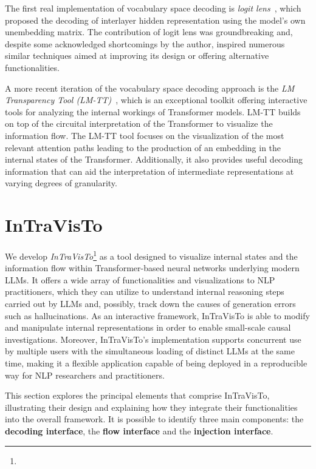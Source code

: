 \documentclass[11pt,a4paper,twocolumn]{article}
\begin{document}
The first real implementation of vocabulary space decoding is \emph{logit lens}~\cite{nostalgebraist2020}, which proposed the decoding of interlayer hidden representation using the model's own unembedding matrix.
The contribution of logit lens was groundbreaking and, despite some acknowledged shortcomings by the author, inspired numerous similar techniques aimed at improving its design or offering alternative functionalities.

A more recent iteration of the vocabulary space decoding approach is the \emph{LM Transparency Tool (LM-TT)}~\cite{tufanov2024}, which is an exceptional toolkit offering interactive tools for analyzing the internal workings of Transformer models.
LM-TT builds on top of the circuital interpretation of the Transformer to visualize the information flow.
The LM-TT tool focuses on the visualization of the most relevant attention paths leading to the production of an embedding in the internal states of the Transformer.
Additionally, it also provides useful decoding information that can aid the interpretation of intermediate representations at varying degrees of granularity.

\section{InTraVisTo}\label{sec:intravisto}

We develop \emph{InTraVisTo}\footnote{} as a tool designed to visualize internal states and the information flow within Transformer-based neural networks underlying modern LLMs.
It offers a wide array of functionalities and visualizations to NLP practitioners, which they can utilize to understand internal reasoning steps carried out by LLMs and, possibly, track down the causes of generation errors such as hallucinations.
As an interactive framework, InTraVisTo is able to modify and manipulate internal representations in order to enable small-scale causal investigations.
Moreover, InTraVisTo's implementation supports concurrent use by multiple users with the simultaneous loading of distinct LLMs at the same time, making it a flexible application capable of being deployed in a reproducible way for NLP researchers and practitioners.

This section explores the principal elements that comprise InTraVisTo, illustrating their design and explaining how they integrate their functionalities into the overall framework.
It is possible to identify three main components: the \textbf{decoding interface}, the \textbf{flow interface} and the \textbf{injection interface}.
\end{document}
